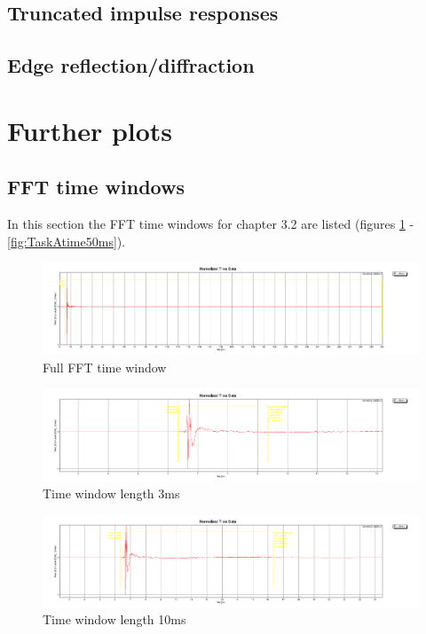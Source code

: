 \documentclass{article}
\begin{document}
\subsection{Truncated impulse responses}
\subsection{Edge reflection/diffraction}


\section{Further plots}
\subsection{FFT time windows}
In this section the FFT time windows for chapter 3.2 are listed (figures \ref{fig:TaskAtimecomplete} - \ref{fig:TaskAtime50ms}).
\begin{figure}[htbp]
\begin{center}
\includegraphics[width=15cm,keepaspectratio=true]{Figures/TaskAtimecomplete}
\caption{Full FFT time window}
\label{fig:TaskAtimecomplete}
\end{center}
\end{figure}
\begin{figure}[htbp]
\begin{center}
\includegraphics[width=15cm,keepaspectratio=true]{Figures/TaskAtime3ms}
\caption{Time window length 3ms}
\label{fig:TaskAtime3ms}
\end{center}
\end{figure}
\begin{figure}[htbp]
\begin{center}
\includegraphics[width=15cm,keepaspectratio=true]{Figures/TaskAtime10ms}
\caption{Time window length 10ms}
\label{fig:TaskAtime10ms}
\end{center}
\end{figure}
\end{document}
